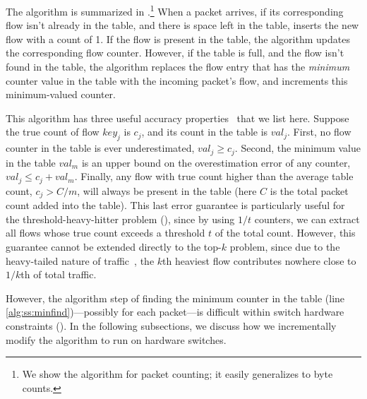 The algorithm is summarized in .\footnote{We show the algorithm
  for packet counting; it easily generalizes to byte counts.}
%
When a packet arrives, if its corresponding flow isn't already in the table, and
there is space left in the table, \spacesaving inserts the new flow with a count
of 1. If the flow is present in the table, the algorithm updates the
corresponding flow counter. However, if the table is full, and the flow isn't
found in the table, the algorithm replaces the flow entry that has the {\em
  minimum} counter value in the table with the incoming packet's flow, and
increments this minimum-valued counter.

This algorithm has three useful accuracy properties~\cite{metwally2005efficient}
that we list here. Suppose the true count of flow $key_j$ is $c_j$, and its
count in the table is $val_j$. First, no flow counter in the table is ever
underestimated, \ie $val_j \geq c_j$.
Second, the minimum value in the table $val_m$ is an upper bound on the
overestimation error of any counter, \ie $val_j \leq c_j + val_m$.
Finally, any flow with true count higher than the average table count, \ie $c_j
> C/m$, will always be present in the table (here $C$ is the total packet count
added into the table). This last error guarantee is particularly useful for the
threshold-heavy-hitter problem (), since by using $1/t$
counters, we can extract all flows whose true count exceeds a threshold $t$ of
the total count. However, this guarantee cannot be extended directly to the
top-$k$ problem, since due to the heavy-tailed nature of
traffic~\cite{estan2002new}, the $k$th heaviest flow contributes nowhere close
to $1/k$th of total traffic.

However, the algorithm step of finding the minimum counter in the table (line
\ref{alg:ss:minfind})---possibly for each packet---is difficult within switch
hardware constraints ().
%
In the following subsections, we discuss how we incrementally modify the
\spacesaving algorithm to run on hardware switches.


